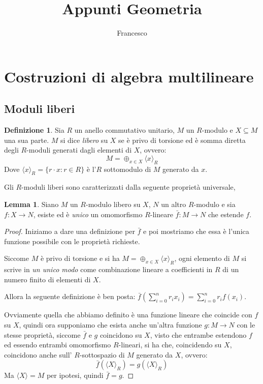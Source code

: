 \documentclass[12pt, a4paper]{article}
\title{Appunti Geometria}
\author{Francesco}
\theoremstyle{definition}
\newtheorem{defi}{Definizione}
\newtheorem{lem}{Lemma}
\begin{document}
\maketitle
\tableofcontents
\newpage

\section{Costruzioni di algebra multilineare}

\subsection{Moduli liberi} \label{sec:modulo-libero}
\begin{defi}
\label{def:modulo-libero}
Sia $R$ un anello commutativo unitario, $M$ un $R$-modulo e $X \subseteq M$ una sua parte.
$M$ si dice \emph{libero} su $X$ se è privo di torsione ed è somma diretta degli $R$-moduli generati dagli elementi di $X$, ovvero:
$$M = \oplus_{x \in X} \langle x \rangle_R$$
Dove $\langle x \rangle_R = \{ r \cdot x : r \in R \}$ è l'$R$ sottomodulo di $M$ generato da $x$.
\end{defi}

Gli $R$-moduli liberi sono caratterizzati dalla seguente proprietà universale,

\begin{lem}
\label{thm:prop-universale-modulo-libero}
Siano $M$ un $R$-modulo libero su $X$, $N$ un altro $R$-modulo e sia $f : X \to N$,
esiste ed è \emph{unico} un omomorfismo $R$-lineare $\bar{f} : M \to N$ che estende $f$.
\end{lem}

\begin{proof}
Iniziamo a dare una definizione per $\bar{f}$ e poi mostriamo che essa è l'unica funzione possibile con le proprietà richieste.

Siccome $M$ è privo di torsione e si ha $M = \oplus_{x \in X} \langle x \rangle_R$, ogni elemento di $M$ si scrive in \emph{un unico modo} come combinazione lineare a coefficienti in $R$ di un numero finito di elementi di $X$.

Allora la seguente definizione è ben posta: $\bar{f}(\sum\limits_{i = 0}^{n} r_i x_i) = \sum\limits_{i = 0}^{n} r_i f(x_i)$.

Ovviamente quella che abbiamo definito è una funzione lineare che coincide con $f$ su $X$, quindi ora supponiamo che esista anche un'altra funzione $g : M \to N$ con le stesse proprietà,
siccome $\bar{f}$ e $g$ coincidono su $X$, visto che entrambe estendono $f$ ed essendo entrambi omomorfismo $R$-lineari, si ha che, coincidendo su $X$, coincidono anche sull' $R$-sottospazio di $M$ generato da $X$, ovvero:
$$\bar{f}(\langle X \rangle_R) = g(\langle X \rangle_R)$$
Ma $\langle X \rangle = M$ per ipotesi, quindi $\bar{f} = g$.
\end{proof}
\end{document}
